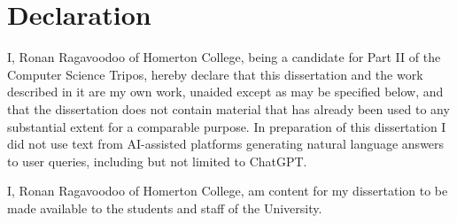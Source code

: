 \documentclass[final,rdr32.tex]{subfiles}
\begin{document}
\clearpage
\section*{Declaration}

I, Ronan Ragavoodoo of Homerton College, being a candidate for Part II of the Computer Science Tripos, hereby declare that this dissertation and the work described in it are my own work, unaided except as may be specified below, and that the dissertation does not contain material that has already been used to any substantial extent for a comparable purpose. In preparation of this dissertation I did not use text from AI-assisted platforms generating natural language answers to user queries, including but not limited to ChatGPT.
\bigskip

\noindent I, Ronan Ragavoodoo of Homerton College, am content for my dissertation to be made
available to the students and staff of the University.

\vskip1in

\par\noindent{} \hfill\makebox[2.0in]{\today}%
\vspace{-12pt}
\par\noindent\makebox[2.5in]{\hrulefill} \hfill\makebox[2.0in]{\hrulefill}%
\par\noindent{}      \hfill{}%
\end{document}
